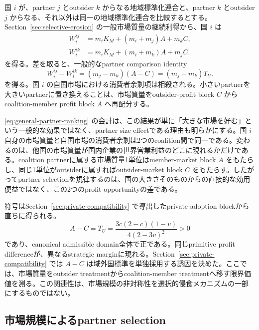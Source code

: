 国 $i$ が、partner $j$ とoutsider $k$ からなる地域標準化連合と、partner $k$ とoutsider $j$ からなる、それ以外は同一の地域標準化連合を比較するとする。Section~\ref{sec:selective-erosion} の一般市場質量の継続利得から、国 $i$ は
\begin{align}
    W_i^{ij}
    &=m_iK_M+(m_i+m_j)A+m_kC,
    \label{eq:partner-payoff-ij}\\
    W_i^{ik}
    &=m_iK_M+(m_i+m_k)A+m_jC.
    \label{eq:partner-payoff-ik}
\end{align}
を得る。差を取ると、一般的なpartner comparison identity
\begin{equation}
    \boxed{
    W_i^{ij}-W_i^{ik}
    =(m_j-m_k)(A-C)
    =(m_j-m_k)T_U.
    }
    \label{eq:general-partner-ranking}
\end{equation}
を得る。国 $i$ の自国市場における消費者余剰項は相殺される。小さいpartnerを大きいpartnerに置き換えることは、市場質量をoutsider-profit block $C$ からcoalition-member profit block $A$ へ再配分する。

\eqref{eq:general-partner-ranking} の会計は、この結果が単に「大きな市場を好む」という一般的な効果ではなく、partner size effectである理由も明らかにする。国 $i$ 自身の市場質量と自国市場の消費者余剰は2つのcoalition間で同一である。変わるのは、他国の市場質量が国内企業の世界営業利益のどこに現れるかだけである。coalition partnerに属する市場質量1単位はmember-market block $A$ をもたらし、同じ1単位がoutsiderに属すればoutsider-market block $C$ をもたらす。したがってpartner selectionを規律するのは、国の大きさそのものからの直接的な効用便益ではなく、この2つのprofit opportunityの差である。

符号はSection~\ref{sec:private-compatibility} で導出したprivate-adoption blockから直ちに得られる。
\begin{equation}
    A-C=T_U
    =\frac{3c(2-c)(1-v)}{4(2-3v)^2}>0
    \label{eq:partner-ranking-tu}
\end{equation}
であり、canonical admissible domain全体で正である。同じprimitive profit differenceが、異なるstrategic marginに現れる。Section~\ref{sec:private-compatibility} では $A-C$ は域外国標準を単独採用する誘因を決めた。ここでは、市場質量をoutsider treatmentからcoalition-member treatmentへ移す限界価値を測る。この関連性は、市場規模の非対称性を選択的侵食メカニズムの一部にするものではない。

\subsection{市場規模によるpartner selection}
\label{subsec:market-size-partner-selection}

